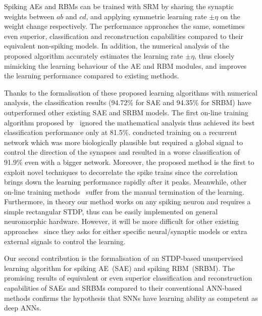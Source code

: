 Spiking AEs and RBMs can be trained with SRM by sharing the synaptic weights between $ab$ and $cd$, and applying symmetric learning rate $\pm \eta$ on the weight change respectively.
The performance approaches the same, sometimes even superior, classification and reconstruction capabilities compared to their equivalent non-spiking models.
In addition, the numerical analysis of the proposed algorithm accurately estimates the learning rate $\pm \eta$, thus closely mimicking the learning behaviour of the AE and RBM modules, and improves the learning performance compared to existing methods.






Thanks to the formalisation of these proposed learning algorithms with numerical analysis, the classification results (94.72\% for SAE and 94.35\% for SRBM) have outperformed other existing SAE and SRBM models.
The first on-line training algorithm proposed by~\citet{neil2013online} ignored the mathematical analysis thus achieved its best classification performance only at 81.5\%.
\citet{neftci2013event} conducted training on a recurrent network which was more biologically plausible but required a global signal to control the direction of the synapses and resulted in a worse classification of 91.9\% even with a bigger network.
Moreover, the proposed method is the first to exploit novel techniques to decorrelate the spike trains since the correlation brings down the learning performance rapidly after it peaks.
Meanwhile, other on-line training methods~\citep{neftci2016stochastic,neftci2017event} suffer from the manual termination of the learning.
Furthermore, in theory our method works on any spiking neuron and requires a simple rectangular STDP, thus can be easily implemented on general neuromorphic hardware.
However, it will be more difficult for other existing approaches~\citep{neftci2013event,neftci2016stochastic,neftci2017event} since they asks for either specific neural/synaptic models or extra external signals to control the learning.

Our second contribution is the formalisation of an STDP-based unsupervised learning algorithm for spiking AE~(SAE) and spiking RBM~(SRBM).
The promising results of equivalent or even superior classification and reconstruction capabilities of SAEs and SRBMs compared to their conventional ANN-based methods confirms the hypothesis that SNNs have learning ability as competent as deep ANNs.

